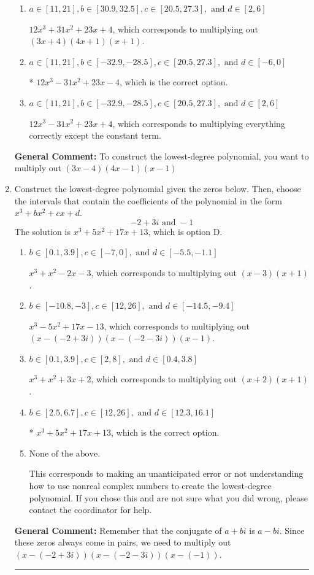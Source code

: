 \documentclass{extbook}[14pt]
\newcommand{\litem}[1]{\item #1

\rule{\textwidth}{0.4pt}}
\begin{document}
\begin{enumerate}
{\begin{enumerate}[label=\Alph*.]
$12x^{3} +7 x^{2} -15 x -4$, which corresponds to multiplying out $(3x + 4)(4x + 1)(x -1)$.
\item \( a \in [11, 21], b \in [30.9, 32.5], c \in [20.5, 27.3], \text{ and } d \in [2, 6] \)

$12x^{3} +31 x^{2} +23 x + 4$, which corresponds to multiplying out $(3x + 4)(4x + 1)(x + 1)$.
\item \( a \in [11, 21], b \in [-32.9, -28.5], c \in [20.5, 27.3], \text{ and } d \in [-6, 0] \)

* $12x^{3} -31 x^{2} +23 x -4$, which is the correct option.
\item \( a \in [11, 21], b \in [-32.9, -28.5], c \in [20.5, 27.3], \text{ and } d \in [2, 6] \)

$12x^{3} -31 x^{2} +23 x + 4$, which corresponds to multiplying everything correctly except the constant term.
\end{enumerate}

\textbf{General Comment:} To construct the lowest-degree polynomial, you want to multiply out $(3x -4)(4x -1)(x -1)$
}
\litem{
Construct the lowest-degree polynomial given the zeros below. Then, choose the intervals that contain the coefficients of the polynomial in the form $x^3+bx^2+cx+d$.
\[ -2 + 3 i \text{ and } -1 \]The solution is \( x^{3} +5 x^{2} +17 x + 13 \), which is option D.\begin{enumerate}[label=\Alph*.]
\item \( b \in [0.1, 3.9], c \in [-7, 0], \text{ and } d \in [-5.5, -1.1] \)

$x^{3} + x^{2} -2 x -3$, which corresponds to multiplying out $(x -3)(x + 1)$.
\item \( b \in [-10.8, -3], c \in [12, 26], \text{ and } d \in [-14.5, -9.4] \)

$x^{3} -5 x^{2} +17 x -13$, which corresponds to multiplying out $(x-(-2 + 3 i))(x-(-2 - 3 i))(x -1)$.
\item \( b \in [0.1, 3.9], c \in [2, 8], \text{ and } d \in [0.4, 3.8] \)

$x^{3} + x^{2} +3 x + 2$, which corresponds to multiplying out $(x + 2)(x + 1)$.
\item \( b \in [2.5, 6.7], c \in [12, 26], \text{ and } d \in [12.3, 16.1] \)

* $x^{3} +5 x^{2} +17 x + 13$, which is the correct option.
\item \( \text{None of the above.} \)

This corresponds to making an unanticipated error or not understanding how to use nonreal complex numbers to create the lowest-degree polynomial. If you chose this and are not sure what you did wrong, please contact the coordinator for help.
\end{enumerate}

\textbf{General Comment:} Remember that the conjugate of $a+bi$ is $a-bi$. Since these zeros always come in pairs, we need to multiply out $(x-(-2 + 3 i))(x-(-2 - 3 i))(x-(-1))$.
}
\end{enumerate}
\end{document}
